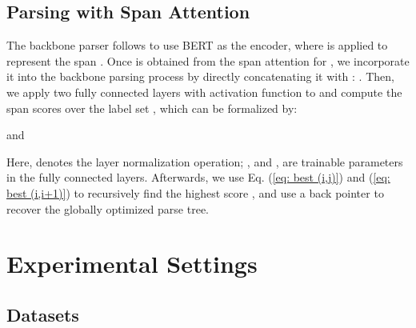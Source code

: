 \documentclass[11pt,a4paper]{article}
\begin{document}
\subsection{Parsing with Span Attention}


The backbone parser follows \citet{kitaev-etal-2019-multilingual} to use BERT as the encoder, where  is applied to represent the span .
Once  is obtained from the span attention for , we incorporate it into the backbone parsing process by directly concatenating it with :
.
Then, we apply two fully connected layers with  activation function to  and compute the span scores  over the label set , which can be formalized by:

and

Here,  denotes the layer normalization operation;
,  and ,  are trainable parameters in the fully connected layers.
Afterwards, we use Eq. (\ref{eq: best (i,j)}) and (\ref{eq: best (i,i+1)}) to recursively find the highest score , and use a back pointer to recover the globally optimized parse tree.



\section{Experimental Settings}


\subsection{Datasets}
\end{document}

